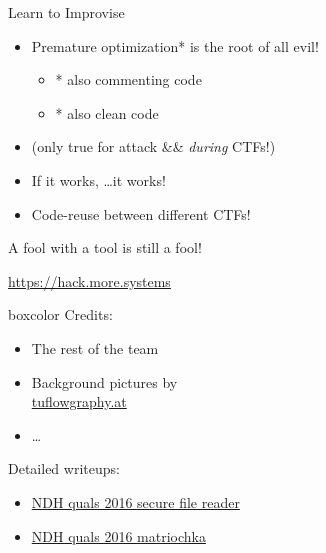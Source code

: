 \begin{frame}
  {Learn to Improvise}

  \begin{itemize}
    \item Premature optimization* is the root of all evil!
      \begin{itemize}
        \item * also commenting code
        \item * also clean code
      \end{itemize}
    \item (only true for attack \&\&  \emph{during} CTFs!)
    \item If it works, \ldots it works!
    \item Code-reuse between different CTFs!
  \end{itemize}

\end{frame}

\begin{frame}[plain]
	\begin{center}
		\huge A fool with a tool is still a fool!
	\end{center}
\end{frame}

{
\begin{frame}[plain]


  \begin{center}
    \color{white}
    {\huge \url{https://hack.more.systems}}
  \end{center}



  \begin{beamercolorbox}[sep=1em,wd=6cm]{boxcolor}
    Credits:

    \begin{itemize}
      \item The rest of the team
      \item Background pictures by \\
        \url{tuflowgraphy.at}
      \item \ldots
    \end{itemize}

    Detailed writeups:

    {\footnotesize
      \begin{itemize}
        \item \href{https://losfuzzys.github.io/writeup/2016/04/04/ndhquals2016-secure-file-reader/}
          {NDH quals 2016 secure file reader}
        \item \href{https://losfuzzys.github.io/writeup/2016/04/04/ndhquals2016-matriochka/}
          {NDH quals 2016 matriochka}
      \end{itemize}
    }
  \end{beamercolorbox}

\end{frame}
}
